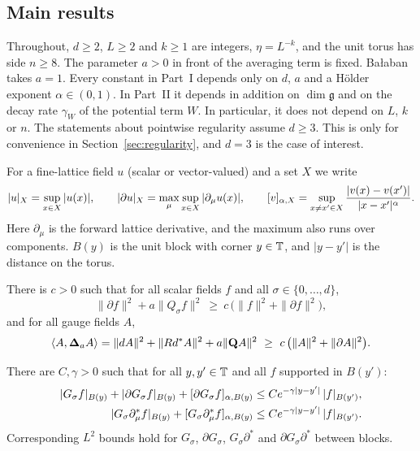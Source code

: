 \subsection{Main results}

Throughout, $d\ge2$, $L\ge2$ and $k\ge1$ are integers, $\eta=L^{-k}$, and the unit torus has side $n\ge8$. The parameter $a>0$ in front of the averaging term is fixed. Ba\l aban takes $a=1$. Every constant in Part~I depends only on $d$, $a$ and a H\"older exponent $\alpha\in(0,1)$. In Part~II it depends in addition on $\dim\mathfrak g$ and on the decay rate $\gamma_W$ of the potential term $W$. In particular, it does not depend on $L$, $k$ or $n$. The statements about pointwise regularity assume $d\ge3$. This is only for convenience in Section~\ref{sec:regularity}, and $d=3$ is the case of interest.

For a fine-lattice field $u$ (scalar or vector-valued) and a set $X$ we write
\[
|u|_X=\sup_{x\in X}|u(x)|,\qquad
|\partial u|_X=\max_\mu\sup_{x\in X}|\partial_\mu u(x)|,\qquad
[v]_{\alpha,X}=\sup_{x\ne x'\in X}\frac{|v(x)-v(x')|}{|x-x'|^\alpha}.
\]
Here $\partial_\mu$ is the forward lattice derivative, and the maximum also runs over components. $B(y)$ is the unit block with corner $y\in\mathbb T$, and $|y-y'|$ is the distance on the torus.

\begin{maintheorem}\label{thm:A}
There is $c>0$ such that for all scalar fields $f$ and all $\sigma\in\{0,\dots,d\}$,
\[
\|\partial f\|^2+a\|Q_\sigma f\|^2\ \ge\ c\,\big(\|f\|^2+\|\partial f\|^2\big),
\]
and for all gauge fields $A$,
\[
\langle A,\boldsymbol{\Delta}_a A\rangle=\|dA\|^2+\|Rd^*A\|^2+a\|\mathbf Q A\|^2\ \ge\ c\,\big(\|A\|^2+\|\partial A\|^2\big).
\]
\end{maintheorem}

\begin{maintheorem}\label{thm:B}
There are $C,\gamma>0$ such that for all $y,y'\in\mathbb T$ and all $f$ supported in $B(y')$:
\begin{align*}
|G_\sigma f|_{B(y)}+|\partial G_\sigma f|_{B(y)}+[\partial G_\sigma f]_{\alpha,B(y)}&\le Ce^{-\gamma|y-y'|}\,|f|_{B(y')},\\
|G_\sigma \partial_\mu^* f|_{B(y)}+[G_\sigma\partial^*_\mu f]_{\alpha,B(y)}&\le Ce^{-\gamma|y-y'|}\,|f|_{B(y')}.
\end{align*}
Corresponding $L^2$ bounds hold for $G_\sigma$, $\partial G_\sigma$, $G_\sigma\partial^*$ and $\partial G_\sigma\partial^*$ between blocks.
\end{maintheorem}

